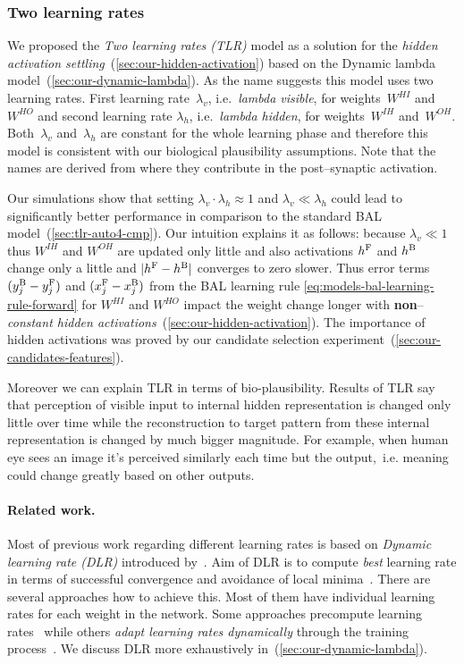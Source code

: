 
\subsubsection{Two learning rates} 
\label{sec:our-tlr}

We proposed the \emph{Two learning rates (TLR)} model as a solution for the \emph{hidden activation settling}~(\ref{sec:our-hidden-activation}) based on the Dynamic lambda model~(\ref{sec:our-dynamic-lambda}). As the name suggests this model uses two learning rates. First learning rate~$\lambda_v$, i.e.~\emph{lambda visible}, for weights~$W^{HI}$ and~$W^{HO}$ and second learning rate $\lambda_h$, i.e.~\emph{lambda hidden}, for weights~$W^{IH}$ and~$W^{OH}$. Both~$\lambda_v$ and~$\lambda_h$ are constant for the whole learning phase and therefore this model is consistent with our biological plausibility assumptions. Note that the names are derived from where they contribute in the post--synaptic activation. 

Our simulations show that setting $\lambda_v \cdot \lambda_h \approx 1$ and $\lambda_v \ll \lambda_h$ could lead to significantly better performance in comparison to the standard BAL model~(\ref{sec:tlr-auto4-cmp}). Our intuition explains it as follows: because $\lambda_v \ll 1$ thus $W^{IH}$ and $W^{OH}$ are updated only little and also activations $h^{\rm F}$ and $h^{\rm B}$ change only a little and $|h^{\rm F}- h^{\rm B}|$ converges to zero slower. Thus error terms $(y_j^{\rm B} - y_j^{\rm F})$ and $(x_j^{\rm F} - x_j^{\rm B})$ from the BAL learning rule \ref{eq:models-bal-learning-rule-forward} for $W^{HI}$ and $W^{HO}$ impact the weight change longer with {\bf non}--\emph{constant hidden activations}~(\ref{sec:our-hidden-activation}). The importance of hidden activations was proved by our candidate selection experiment~(\ref{sec:our-candidates-features}). 

Moreover we can explain TLR in terms of bio-plausibility. Results of TLR say that perception of visible input to internal hidden representation is changed only little over time while the reconstruction to target pattern from these internal representation is changed by much bigger magnitude. For example, when human eye sees an image it's perceived similarly each time but the output,~i.e. meaning could change greatly based on other outputs. 

\paragraph{Related work.} 
\label{sec:our-tlr-related-work}
Most of previous work regarding different learning rates is based on \emph{Dynamic learning rate (DLR)} introduced by~\citet{jacobs1988increased}. Aim of DLR is to compute \emph{best} learning rate in terms of successful convergence and avoidance of local minima~\citep{behera2006adaptive}. There are several approaches how to achieve this. Most of them have individual learning rates for each weight in the network. Some approaches precompute learning rates~\citep{weir1991method} while others \emph{adapt learning rates dynamically} through the training process~\citep{yu1997efficient, magoulas1999improving, yu2002backpropagation}. We discuss DLR more exhaustively in~(\ref{sec:our-dynamic-lambda}). 

